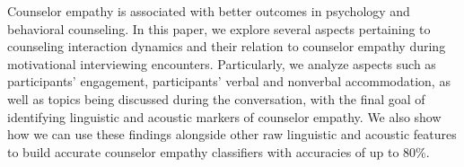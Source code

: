 Counselor empathy is associated with better outcomes in psychology and behavioral counseling. In this paper, we explore several aspects pertaining to counseling interaction dynamics and their relation to counselor empathy during motivational interviewing encounters. Particularly, we analyze aspects such as participants' engagement, participants' verbal and nonverbal accommodation, as well as topics being discussed during the conversation, with the final goal of identifying linguistic and acoustic markers of counselor empathy. We also show how we can use these findings alongside other raw linguistic and acoustic features to  build accurate counselor empathy classifiers with accuracies of up to 80\%.
